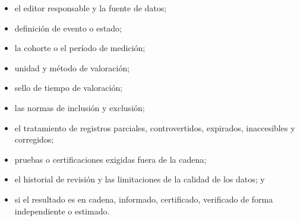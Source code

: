\documentclass[11pt]{article}
\begin{document}
\begin{itemize}[leftmargin=*]
\item el editor responsable y la fuente de datos;
\item definición de evento o estado;
\item la cohorte o el período de medición;
\item unidad y método de valoración;
\item sello de tiempo de valoración;
\item las normas de inclusión y exclusión;
\item el tratamiento de registros parciales, controvertidos, expirados, inaccesibles y corregidos;
\item pruebas o certificaciones exigidas fuera de la cadena;
\item el historial de revisión y las limitaciones de la calidad de los datos; y
\item si el resultado es en cadena, informado, certificado, verificado de forma independiente o estimado.
\end{itemize}
\end{document}
